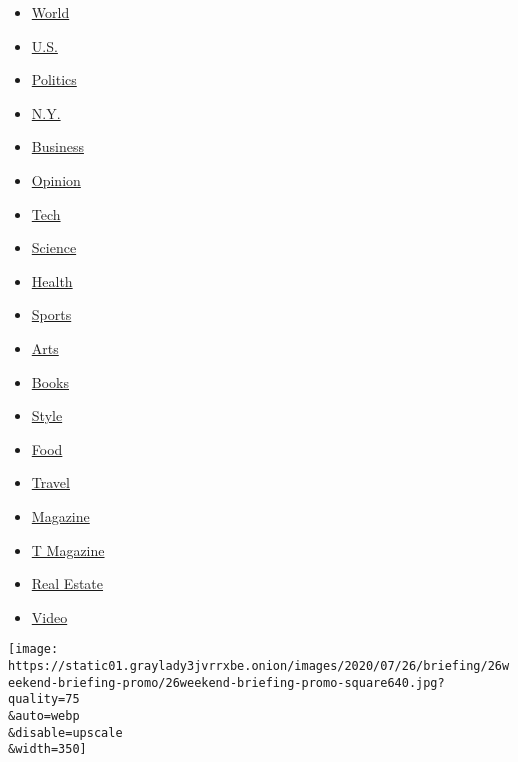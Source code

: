 \begin{itemize}
\tightlist
\item
  \href{https://www.nytimes3xbfgragh.onion/section/world}{World}
\item
  \href{https://www.nytimes3xbfgragh.onion/section/us}{U.S.}
\item
  \href{https://www.nytimes3xbfgragh.onion/section/politics}{Politics}
\item
  \href{https://www.nytimes3xbfgragh.onion/section/nyregion}{N.Y.}
\item
  \href{https://www.nytimes3xbfgragh.onion/section/business}{Business}
\item
  \href{https://www.nytimes3xbfgragh.onion/section/opinion}{Opinion}
\item
  \href{https://www.nytimes3xbfgragh.onion/section/technology}{Tech}
\item
  \href{https://www.nytimes3xbfgragh.onion/section/science}{Science}
\item
  \href{https://www.nytimes3xbfgragh.onion/section/health}{Health}
\item
  \href{https://www.nytimes3xbfgragh.onion/section/sports}{Sports}
\item
  \href{https://www.nytimes3xbfgragh.onion/section/arts}{Arts}
\item
  \href{https://www.nytimes3xbfgragh.onion/section/books}{Books}
\item
  \href{https://www.nytimes3xbfgragh.onion/section/style}{Style}
\item
  \href{https://www.nytimes3xbfgragh.onion/section/food}{Food}
\item
  \href{https://www.nytimes3xbfgragh.onion/section/travel}{Travel}
\item
  \href{https://www.nytimes3xbfgragh.onion/section/magazine}{Magazine}
\item
  \href{https://www.nytimes3xbfgragh.onion/section/t-magazine}{T
  Magazine}
\item
  \href{https://www.nytimes3xbfgragh.onion/section/realestate}{Real
  Estate}
\item
  \href{https://www.nytimes3xbfgragh.onion/video}{Video}
\end{itemize}

\href{/2020/07/26/briefing/coronavirus-hurricane-hanna-regis-philbin.html}{}

\texttt{[image: https://static01.graylady3jvrrxbe.onion/images/2020/07/26/briefing/26weekend-briefing-promo/26weekend-briefing-promo-square640.jpg?quality=75\\\&auto=webp\\\&disable=upscale\\\&width=350]}

